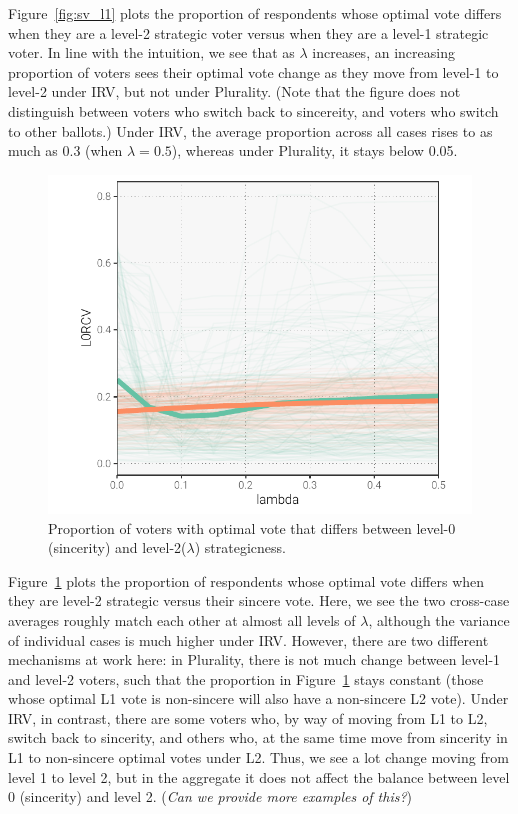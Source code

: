 \documentclass[12pt, letter]{article}
\begin{document}
Figure~\ref{fig:sv_l1} plots the proportion of respondents whose optimal vote differs when they are a level-2 strategic voter versus when they are a level-1 strategic voter. In line with the intuition, we see that as $\lambda$ increases, an increasing proportion of voters sees their optimal vote change as they move from level-1 to level-2 under IRV, but not under Plurality. (Note that the figure does not distinguish between voters who switch back to sincereity, and voters who switch to other ballots.) Under IRV, the average proportion across all cases rises to as much as 0.3 (when $\lambda = 0.5$), whereas under Plurality, it stays below 0.05.

\begin{figure}[!htb]
	\centering
	\includegraphics[width = 0.6 \textwidth]{../output/figures/cses_l0.pdf}
	\caption{Proportion of voters with optimal vote that differs between level-0 (sincerity) and level-2($\lambda$) strategicness.}
	\label{fig:sv_l0}
\end{figure}

Figure~\ref{fig:sv_l0} plots the proportion of respondents whose optimal vote differs when they are level-2 strategic versus their sincere vote. Here, we see the two cross-case averages roughly match each other at almost all levels of $\lambda$, although the variance of individual cases is much higher under IRV. However, there are two different mechanisms at work here: in Plurality, there is not much change between level-1 and level-2 voters, such that the proportion in Figure~\ref{fig:sv_l0} stays constant (those whose optimal L1 vote is non-sincere will also have a non-sincere L2 vote). Under IRV, in contrast, there are some voters who, by way of moving from L1 to L2, switch back to sincerity, and others who, at the same time move from sincerity in L1 to non-sincere optimal votes under L2. Thus, we see a lot change moving from level 1 to level 2, but in the aggregate it does not affect the balance between level 0 (sincerity) and level 2. (\emph{Can we provide more examples of this?})
\end{document}
